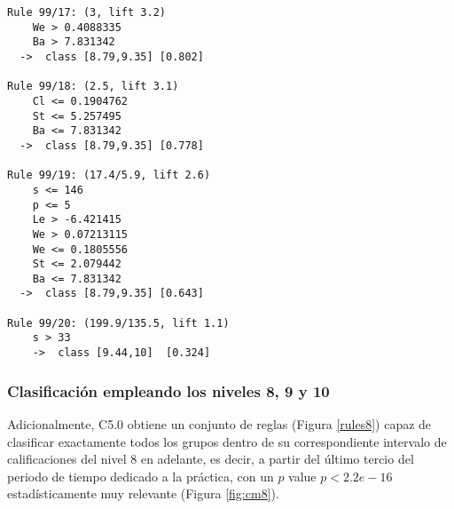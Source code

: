 \begin{tcolorbox}[title=Reglas de clasificación para identificar intervalos de notas.]
\begin{multicols}{3}
\begin{verbatim}
Rule 99/17: (3, lift 3.2)
	We > 0.4088335
	Ba > 7.831342
  ->  class [8.79,9.35] [0.802]

Rule 99/18: (2.5, lift 3.1)
	Cl <= 0.1904762
	St <= 5.257495
	Ba <= 7.831342
  ->  class [8.79,9.35] [0.778]

Rule 99/19: (17.4/5.9, lift 2.6)
	s <= 146
	p <= 5
	Le > -6.421415
	We > 0.07213115
	We <= 0.1805556
	St <= 2.079442
	Ba <= 7.831342
  ->  class [8.79,9.35] [0.643]

Rule 99/20: (199.9/135.5, lift 1.1)
	s > 33
	->  class [9.44,10]  [0.324]
    \end{verbatim}
  \end{multicols}
\label{rules7}
\end{tcolorbox}

\subsubsection{Clasificación empleando los niveles 8, 9 y 10}

Adicionalmente, C5.0 obtiene un conjunto de reglas (Figura \ref{rules8}) capaz de clasificar exactamente todos los grupos dentro de su correspondiente intervalo de calificaciones del nivel $8$ en adelante, es decir, a partir del último tercio del periodo de tiempo dedicado a la práctica, con un $p$ value $p < 2.2e-16$ estadísticamente muy relevante (Figura \ref{fig:cm8}).

